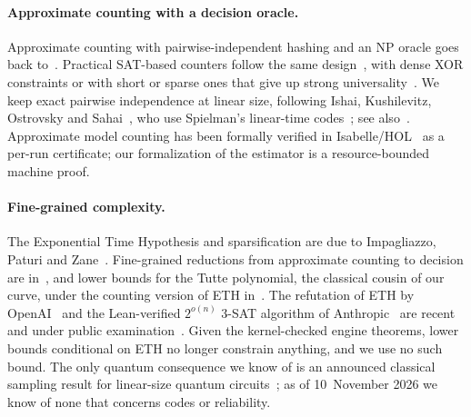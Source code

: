 \documentclass[11pt]{article}
\theoremstyle{remark}
\begin{document}
\paragraph{Approximate counting with a decision oracle.}
Approximate counting with pairwise-independent hashing and an NP oracle
goes back
to~\cite{stockmeyer1985,sipser1983,valiantvazirani1986,jvv1986,carterwegman1979}.
Practical SAT-based counters follow the same
design~\cite{gomes2006,cmv2013,cmv2016,aziz2015projected}, with dense XOR
constraints or with short or sparse ones that give up strong
universality~\cite{ermon2014ldpc,zhao2016xor,achlioptastheodoropoulos2019,meelakshay2020}.
We keep exact pairwise independence at linear size, following Ishai,
Kushilevitz, Ostrovsky and Sahai~\cite{ikos2008}, who use Spielman's
linear-time codes~\cite{spielman1996}; see
also~\cite{mansournisantiwari1993,guruswamiindyk2005,druk2014,brehmresch2026,brehmishairesch2026}.
Approximate model counting has been formally verified in
Isabelle/HOL~\cite{tan2024certified} as a per-run certificate; our
formalization of the estimator is a resource-bounded machine proof.

\paragraph{Fine-grained complexity.}
The Exponential Time Hypothesis and sparsification are due to
Impagliazzo, Paturi and Zane~\cite{ip2001,ipz2001,cikp2003}.
Fine-grained reductions from approximate counting to decision are
in~\cite{delllapinskas2018,dlm2022,thurley2012}, and lower bounds for
the Tutte polynomial, the classical cousin of our curve, under the
counting version of ETH in~\cite{dhmtw2014}. The refutation of ETH by
OpenAI~\cite{openai2026eth} and the Lean-verified \(2^{o(n)}\) 3-SAT
algorithm of Anthropic~\cite{anthropic2026sat} are recent and under
public
examination~\cite{odonnell2026exposition,kintali2026eth,fortnow2026blog,ethdiscussion2026,majdoddin2026,diaslima2026}.
Given the kernel-checked engine theorems, lower bounds conditional on
ETH no longer constrain anything, and we use no such bound. The only
quantum consequence we know of is an announced classical sampling
result for linear-size quantum circuits~\cite{gheorghiugupte2026}; as of
10~November 2026 we know of none that concerns codes or reliability.
\end{document}
